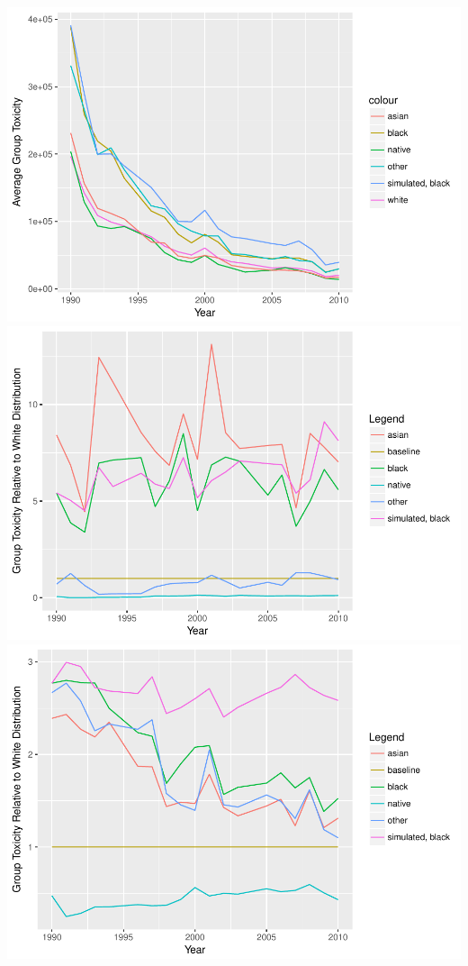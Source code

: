 \documentclass[12pt,twoside]{dukestatscithesis}
\theoremstyle{definition}
\theoremstyle{definition}
\theoremstyle{definition}
\theoremstyle{remark}
\begin{document}
\includegraphics{thesis_files/figure-latex/unnamed-chunk-4-3.pdf}
\includegraphics{thesis_files/figure-latex/unnamed-chunk-4-4.pdf}
\includegraphics{thesis_files/figure-latex/unnamed-chunk-4-5.pdf}
\end{document}
